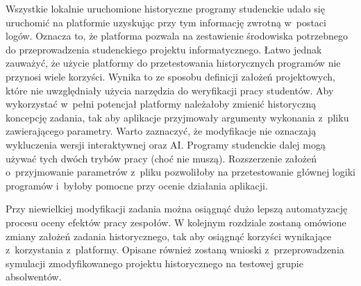 Wszystkie lokalnie uruchomione historyczne programy studenckie udało się uruchomić na platformie uzyskując przy tym informację zwrotną w~postaci logów.
Oznacza to, że platforma pozwala na zestawienie środowiska potrzebnego do przeprowadzenia studenckiego projektu informatycznego.
Łatwo jednak zauważyć, że użycie platformy do przetestowania historycznych programów nie przynosi wiele korzyści.
Wynika to ze sposobu definicji założeń projektowych, które nie uwzględniały użycia narzędzia do weryfikacji pracy studentów.
Aby wykorzystać w~pełni potencjał platformy należałoby zmienić historyczną koncepcję zadania, tak aby aplikacje przyjmowały argumenty wykonania z~pliku zawierającego parametry.
Warto zaznaczyć, że modyfikacje nie oznaczają wykluczenia wersji interaktywnej oraz AI.
Programy studenckie dalej mogą używać tych dwóch trybów pracy (choć nie muszą).
Rozszerzenie założeń o~przyjmowanie parametrów z~pliku pozwoliłoby na przetestowanie głównej logiki programów i~byłoby pomocne przy ocenie działania aplikacji.

Przy niewielkiej modyfikacji zadania można osiągnąć dużo lepszą automatyzację procesu oceny efektów pracy zespołów.
W kolejnym rozdziale zostaną omówione zmiany założeń zadania historycznego, tak aby osiągnąć korzyści wynikające z~korzystania z~platformy.
Opisane również zostaną wnioski z~przeprowadzenia symulacji zmodyfikowanego projektu historycznego na testowej grupie absolwentów.




